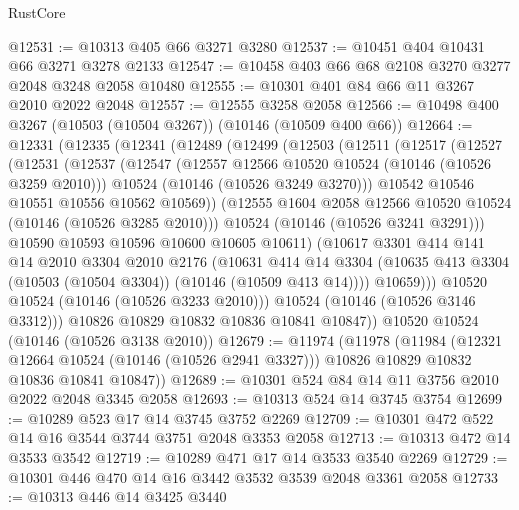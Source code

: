 \begin{lexlean}{RustCore}
\begin{coremodule}
@12531 := @10313 @405 @66 @3271 @3280
@12537 := @10451 @404 @10431 @66 @3271 @3278 @2133
@12547 := @10458 @403 @66 @68 @2108 @3270 @3277 @2048 @3248 @2058 @10480
@12555 := @10301 @401 @84 @66 @11 @3267 @2010 @2022 @2048
@12557 := @12555 @3258 @2058
@12566 := @10498 @400 @3267 (@10503 (@10504 @3267)) (@10146 (@10509 @400 @66))
@12664 := @12331
    (@12335
      (@12341
        (@12489
          (@12499
            (@12503
              (@12511
                (@12517
                  (@12527
                    (@12531
                      (@12537
                        (@12547
                          (@12557 @12566 @10520 @10524 (@10146 (@10526 @3259 @2010)))
                          @10524
                          (@10146 (@10526 @3249 @3270)))
                        @10542
                        @10546
                        @10551
                        @10556
                        @10562
                        @10569))
                    (@12555 @1604 @2058 @12566 @10520 @10524 (@10146 (@10526 @3285 @2010)))
                    @10524
                    (@10146 (@10526 @3241 @3291)))
                  @10590
                  @10593
                  @10596
                  @10600
                  @10605
                  @10611)
                (@10617
                  @3301
                  @414
                  @141
                  @14
                  @2010
                  @3304
                  @2010
                  @2176
                  (@10631
                    @414
                    @14
                    @3304
                    (@10635 @413 @3304 (@10503 (@10504 @3304)) (@10146 (@10509 @413 @14))))
                  @10659)))
            @10520
            @10524
            (@10146 (@10526 @3233 @2010)))
          @10524
          (@10146 (@10526 @3146 @3312)))
        @10826
        @10829
        @10832
        @10836
        @10841
        @10847))
    @10520
    @10524
    (@10146 (@10526 @3138 @2010))
@12679 := @11974
    (@11978
      (@11984
        (@12321 @12664 @10524 (@10146 (@10526 @2941 @3327)))
        @10826
        @10829
        @10832
        @10836
        @10841
        @10847))
@12689 := @10301 @524 @84 @14 @11 @3756 @2010 @2022 @2048 @3345 @2058
@12693 := @10313 @524 @14 @3745 @3754
@12699 := @10289 @523 @17 @14 @3745 @3752 @2269
@12709 := @10301 @472 @522 @14 @16 @3544 @3744 @3751 @2048 @3353 @2058
@12713 := @10313 @472 @14 @3533 @3542
@12719 := @10289 @471 @17 @14 @3533 @3540 @2269
@12729 := @10301 @446 @470 @14 @16 @3442 @3532 @3539 @2048 @3361 @2058
@12733 := @10313 @446 @14 @3425 @3440

\end{coremodule}
\end{lexlean}
